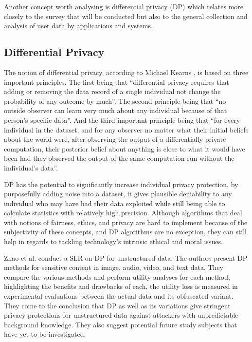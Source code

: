 Another concept worth analysing is differential privacy (DP) which relates more
closely to the survey that will be conducted but also to the general
collection and analysis of user data by applications and systems.

\subsection{Differential Privacy}

The notion of differential privacy, according to Michael Kearns \cite{kearns2019ethical},
is based on three important principles. The first being that ``differential
privacy requires that adding or removing the data record of a single individual
not change the probability of any outcome by much''. The second principle
being that ``no outside observer can learn very much about any individual
because of that person's specific data''. And the third important principle
being that ``for every individual in the dataset, and for any observer no
matter what their initial beliefs about the world were, after observing
the output of a differentially private computation, their posterior belief
about anything is close to what it would have been had they observed the
output of the same computation run without the individual's data''.

DP has the potential to significantly increase individual
privacy protection, by purposefully adding noise into a dataset, it gives
plausible deniability to any individual who may have had their data exploited
while still being able to calculate statistics with relatively high precision.
Although algorithms that deal with notions of fairness, ethics, and privacy
are hard to implement because of the subjectivity of these concepts, and
DP algorithms are no exception, they can still help in
regards to tackling technology's intrinsic ethical and moral issues.

Zhao et al. \cite{ZhaoSurvey} conduct a SLR on DP for
unstructured data. The authors present DP methods for
sensitive content in image, audio, video, and text data. They compare the
various methods and perform utility analyses for each method, highlighting
the benefits and drawbacks of each, the utility loss is measured in experimental
evaluations between the actual data and its obfuscated variant. They come
to the conclusion that DP as well as its variations give
stringent privacy protections for unstructured data against attackers with
unpredictable background knowledge. They also suggest potential future study
subjects that have yet to be investigated.

